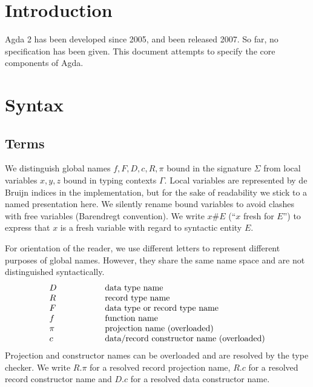 \documentclass[acmlarge,fleqn]{acmart}\settopmatter{}
\begin{document}
\section{Introduction}

Agda 2 has been developed since 2005, and been released 2007.  So far,
no specification has been given.  This document attempts to specify
the core components of Agda.


\section{Syntax}
\label{sec:syntax}

\subsection{Terms}

We distinguish global names $f,F,D,c,R,\pi$ bound in the signature $\Sigma$ from
local variables $x,y,z$ bound in typing contexts $\Gamma$.  Local
variables are represented by de Bruijn indices in the implementation,
but for the sake of readability we stick to a named presentation here.
We silently rename bound variables to avoid clashes with free variables
(Barendregt convention).  We write $x \# E$ (``$x$ fresh for $E$'')
to express that $x$ is a
fresh variable with regard to syntactic entity $E$.

For orientation of the reader, we use different letters to represent
different purposes of global names.  However, they share the same name
space and are not distinguished syntactically.
\[
\begin{array}{l@{\hspace{2cm}}l}
  D & \text{data type name} \\
  R & \text{record type name} \\
  F & \text{data type or record type name} \\
  f & \text{function name} \\
\pi & \text{projection name  (overloaded)} \\
  c & \text{data/record constructor name (overloaded)} \\
\end{array}
\]
Projection and constructor names can be overloaded and are resolved by
the type checker.  We write $R.\pi$ for a resolved record projection
name, $R.c$ for a resolved record constructor name and $D.c$ for a
resolved data constructor name.
\end{document}
